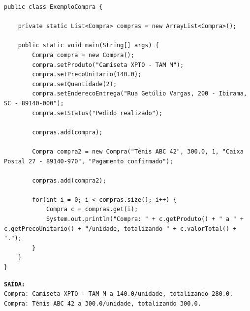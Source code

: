 \begin{verbatim}
public class ExemploCompra {

	private static List<Compra> compras = new ArrayList<Compra>();
	
	public static void main(String[] args) {
		Compra compra = new Compra();
		compra.setProduto("Camiseta XPTO - TAM M");
		compra.setPrecoUnitario(140.0);
		compra.setQuantidade(2);
		compra.setEnderecoEntrega("Rua Getúlio Vargas, 200 - Ibirama, SC - 89140-000");
		compra.setStatus("Pedido realizado");
	
		compras.add(compra);
		
		Compra compra2 = new Compra("Tênis ABC 42", 300.0, 1, "Caixa Postal 27 - 89140-970", "Pagamento confirmado");
	
		compras.add(compra2);
	
		for(int i = 0; i < compras.size(); i++) {
			Compra c = compras.get(i);
			System.out.println("Compra: " + c.getProduto() + " a " + c.getPrecoUnitario() + "/unidade, totalizando " + c.valorTotal() + ".");
		}
	} 
}
\end{verbatim}

\begin{minipage}{\textwidth}
	\textbf{\texttt{SAÍDA:}}\\
	\texttt{Compra: Camiseta XPTO - TAM M a 140.0/unidade, totalizando 280.0.}\\
	\texttt{Compra: Tênis ABC 42 a 300.0/unidade, totalizando 300.0.}
\end{minipage}